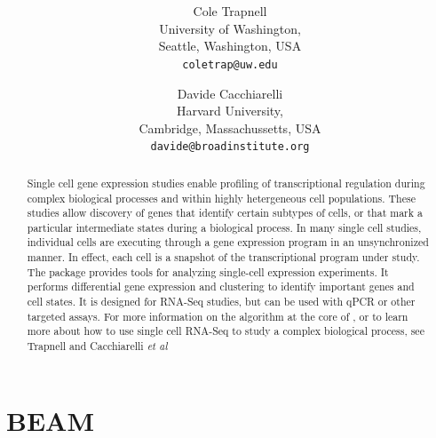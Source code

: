\documentclass[10pt,oneside]{article}\usepackage[]{graphicx}\usepackage[]{color}
\title{\textsf{\textbf{\thetitle}}}
\author{Cole Trapnell\\[1em]University of Washington,\\ Seattle, Washington, USA\\
\texttt{coletrap@uw.edu} \and
Davide Cacchiarelli\\[1em]Harvard University,\\ Cambridge, Massachussetts, USA\\
\texttt{davide@broadinstitute.org}}
\begin{document}
\maketitle

\begin{abstract}
Single cell gene expression studies enable profiling of transcriptional regulation during complex biological processes and within highly hetergeneous cell populations. These studies allow discovery of genes that identify certain subtypes of cells, or that mark a particular intermediate states during a biological process. In many single cell studies, individual cells are executing through a gene expression program in an unsynchronized manner. In effect, each cell is a snapshot of the transcriptional program under study. The package  provides tools for analyzing single-cell expression experiments. It performs differential gene expression and clustering to identify important genes and cell states. It is designed for RNA-Seq studies, but can be used with qPCR or other targeted assays. For more information on the algorithm at the core of , or to learn more about how to use single cell RNA-Seq to study a complex biological process, see Trapnell and Cacchiarelli \emph{et al}\cite{TRAPNELL_CACCHIARELLI}
\end{abstract}

\tableofcontents



\section{BEAM}
\end{document}
